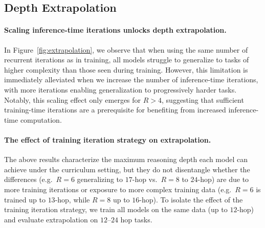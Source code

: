 \documentclass{article} %
\begin{document}

\subsection{Depth Extrapolation}
\paragraph{Scaling inference-time iterations unlocks depth extrapolation.}
In Figure~\ref{fig:extrapolation}, we observe that when using the same number of recurrent iterations as in training, all models struggle to generalize to tasks of higher complexity than those seen during training. 
However, this limitation is immediately alleviated when we increase the number of inference-time iterations, with more iterations enabling generalization to progressively harder tasks. 
Notably, this scaling effect only emerges for $R > 4$, suggesting that sufficient training-time iterations are a prerequisite for benefiting from increased inference-time computation.

\paragraph{The effect of training iteration strategy on extrapolation.}
The above results characterize the maximum reasoning depth each model can achieve under the curriculum setting,
but they do not disentangle whether the differences (e.g.\ $R=6$ generalizing to $17$-hop vs.\ $R=8$ to $24$-hop) are due to more training iterations or exposure to more complex training data (e.g.\ $R=6$ is trained up to $13$-hop, while $R=8$ up to $16$-hop). 
To isolate the effect of the training iteration strategy, we train all models on the same data (up to $12$-hop) and evaluate extrapolation on $12$–$24$ hop tasks.
\end{document}

